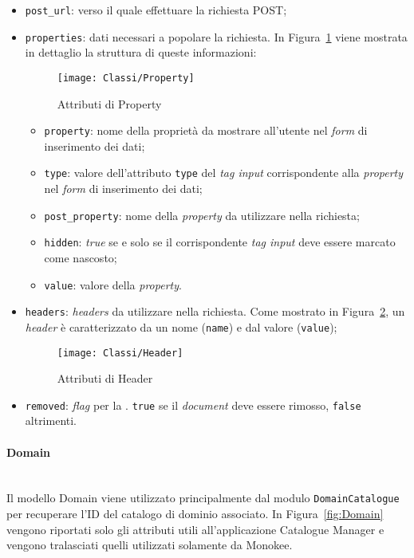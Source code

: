 \begin{itemize}
\item \texttt{post\_url}:  verso il quale effettuare la richiesta POST;
\item \texttt{properties}: dati necessari a popolare la richiesta. In Figura~\ref{fig:Property} viene mostrata in dettaglio la struttura di queste informazioni:
	\begin{figure}[hbpc]
		\begin{center}
	  		\texttt{[image: Classi/Property]}
	 		\caption[Attributi di Property]{Attributi di Property}
	 		\label{fig:Property}
	 	\end{center} 
	\end{figure}
	\begin{itemize}
	\item \texttt{property}: nome della proprietà da mostrare all'utente nel \textit{form} di inserimento dei dati;
	\item \texttt{type}: valore dell'attributo \texttt{type} del \textit{tag input} corrispondente alla \textit{property} nel \textit{form} di inserimento dei dati;
	\item \texttt{post\_property}: nome della \textit{property} da utilizzare nella richiesta;
	\item \texttt{hidden}: \textit{true} se e solo se il corrispondente \textit{tag input} deve essere marcato come nascosto;
	\item \texttt{value}: valore della \textit{property}.
	\end{itemize}
\item \texttt{headers}: \textit{headers} da utilizzare nella richiesta. Come mostrato in Figura~\ref{fig:Header}, un \textit{header} è caratterizzato da un nome (\texttt{name}) e dal valore (\texttt{value});
	\begin{figure}[h]
		\begin{center}
	  		\texttt{[image: Classi/Header]}
	 		\caption[Attributi di Header]{Attributi di Header}
	 		\label{fig:Header}
	 	\end{center} 
	\end{figure}
\item \texttt{removed}: \textit{flag} per la . \texttt{true} se il \textit{document} deve essere rimosso, \texttt{false} altrimenti.
\end{itemize}

\paragraph{Domain} \mbox{} \\
Il modello Domain viene utilizzato principalmente dal modulo \texttt{DomainCatalogue} per recuperare l'ID del catalogo di dominio associato. In Figura~\ref{fig:Domain} vengono riportati solo gli attributi utili all'applicazione Catalogue Manager e vengono tralasciati quelli utilizzati solamente da Monokee.

